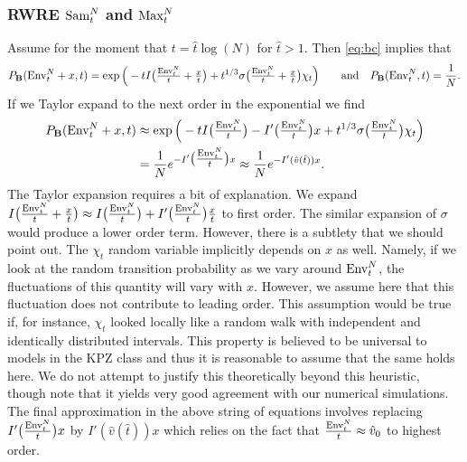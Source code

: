 \subsubsection{RWRE $\mathrm{Sam}^{N}_t$ and $\mathrm{Max}^{N}_t$}\label{sec:RWRE_Sam}
Assume for the moment that $t= \hat{t}\log(N)$ for $\hat{t}>1$. Then \eqref{eq:bc} implies that
$$
P_{\mathbf{B}}( \mathrm{Env}^{N}_t + x,t) =\exp\Big(-tI\big(\tfrac{\mathrm{Env}^{N}_t}{t} +\tfrac{x}{t}\big) + t^{1/3}\sigma\big(\tfrac{\mathrm{Env}^{N}_t}{t} +\tfrac{x}{t}\big)\chi_t\Big)\qquad \textrm{and} \quad P_{\mathbf{B}}( \mathrm{Env}^{N}_t,t) = \frac{1}{N}.
$$
If we Taylor expand to the next order in the exponential we find
\begin{align*}
P_{\mathbf{B}}( \mathrm{Env}^{N}_t + x,t)&\approx \exp\Big(-tI\big(\tfrac{\mathrm{Env}^{N}_t}{t}\big)-I'\big(\tfrac{\mathrm{Env}^{N}_t}{t}\big)x + t^{1/3}\sigma\big(\tfrac{\mathrm{Env}^{N}_t}{t}\big)\chi_t\Big)\\
&=\frac{1}{N} e^{-I'\big(\tfrac{\mathrm{Env}^{N}_t}{t}\big)x} \approx\frac{1}{N}  e^{-I'(\hat{v}(\hat{t}))x}.
\end{align*}
The Taylor expansion requires a bit of explanation. We expand $I\big(\tfrac{\mathrm{Env}^{N}_t}{t} +\tfrac{x}{t}\big) \approx I\big(\tfrac{\mathrm{Env}^{N}_t}{t}\big) + I'\big(\tfrac{\mathrm{Env}^{N}_t}{t}\big) \tfrac{x}{t}$ to first order. The similar expansion of $\sigma$ would produce a lower order term. However, there is a subtlety that we should point out. The $\chi_t$ random variable implicitly depends on $x$ as well. Namely, if we look at the random transition probability as we vary around $\mathrm{Env}^{N}_t$, the fluctuations of this quantity will vary with $x$. However, we assume here that this fluctuation does not contribute to leading order. This assumption would be true if, for instance, $\chi_t$ looked locally like a random walk with independent and identically distributed intervals. This property is believed to be universal to models in the KPZ class and thus it is reasonable to assume that the same holds here. We do not attempt to justify this theoretically beyond this heuristic, though note that it yields very good agreement with our numerical simulations. The final approximation in the above string of equations involves replacing $I'\big(\tfrac{\mathrm{Env}^{N}_t}{t}\big)x$ by $I'(\hat{v}(\hat{t}))x$ which relies on the fact that $\tfrac{\mathrm{Env}^{N}_t}{t}\approx \hat{v}_0$ to highest order.

